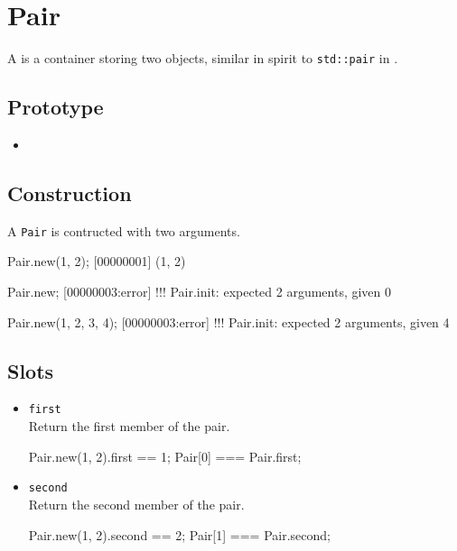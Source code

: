 \section{Pair}

A  is a container storing two objects, similar in spirit to
\lstinline|std::pair| in \Cxx.

\subsection{Prototype}
\begin{itemize}
\item {}
\end{itemize}

\subsection{Construction}

A \lstinline|Pair| is contructed with two arguments.

\begin{urbiscript}[firstnumber=1]
Pair.new(1, 2);
[00000001] (1, 2)

Pair.new;
[00000003:error] !!! Pair.init: expected 2 arguments, given 0

Pair.new(1, 2, 3, 4);
[00000003:error] !!! Pair.init: expected 2 arguments, given 4
\end{urbiscript}

\subsection{Slots}
\begin{itemize}
\item \lstinline|first|\\
  Return the first member of the pair.
\begin{urbiassert}[firstnumber=last]
Pair.new(1, 2).first == 1;
Pair[0] === Pair.first;
\end{urbiassert}

\item \lstinline|second|\\
  Return the second member of the pair.
\begin{urbiassert}[firstnumber=last]
Pair.new(1, 2).second == 2;
Pair[1] === Pair.second;
\end{urbiassert}
\end{itemize}



